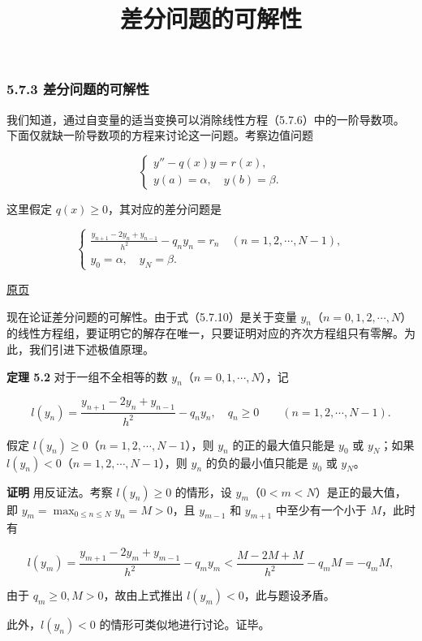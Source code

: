 \documentclass[
  10pt,
  fontset=fandol]{ctexart}
\title{差分问题的可解性}
\author{}
\date{}
\begin{document}
\maketitle

\subsubsection{5.7.3 差分问题的可解性}\label{ux5deeux5206ux95eeux9898ux7684ux53efux89e3ux6027}

我们知道，通过自变量的适当变换可以消除线性方程（5.7.6）中的一阶导数项。下面仅就缺一阶导数项的方程来讨论这一问题。考察边值问题

\[
\begin{cases}
y''-q(x)y=r(x),\\
y(a)=\alpha,\quad y(b)=\beta.
\end{cases}
\tag{5.7.9}
\]

这里假定 \(q(x)\ge0\)，其对应的差分问题是

\[
\begin{cases}
\displaystyle\frac{y_{n+1}-2y_n+y_{n-1}}{h^2}-q_ny_n=r_n\quad(n=1,2,\cdots,N-1),\\[6pt]
y_0=\alpha,\quad y_N=\beta.
\end{cases}
\tag{5.7.10}
\]

\href{../../source-images/pdf-151.jpeg}{原页}

现在论证差分问题的可解性。由于式（5.7.10）是关于变量 \(y_n\)（\(n=0,1,2,\cdots,N\)）的线性方程组，要证明它的解存在唯一，只要证明对应的齐次方程组只有零解。为此，我们引进下述极值原理。

\textbf{定理 5.2} 对于一组不全相等的数 \(y_n\)（\(n=0,1,\cdots,N\)），记

\[
l(y_n)=\frac{y_{n+1}-2y_n+y_{n-1}}{h^2}-q_ny_n,\quad q_n\ge0\qquad(n=1,2,\cdots,N-1).
\]

假定 \(l(y_n)\ge0\)（\(n=1,2,\cdots,N-1\)），则 \(y_n\) 的正的最大值只能是 \(y_0\) 或 \(y_N\)；如果 \(l(y_n)<0\)（\(n=1,2,\cdots,N-1\)），则 \(y_n\) 的负的最小值只能是 \(y_0\) 或 \(y_N\)。

\textbf{证明} 用反证法。考察 \(l(y_n)\ge0\) 的情形，设 \(y_m\)（\(0<m<N\)）是正的最大值，即 \(y_m=\max_{0\le n\le N}y_n=M>0\)，且 \(y_{m-1}\) 和 \(y_{m+1}\) 中至少有一个小于 \(M\)，此时有

\[
l(y_m)=\frac{y_{m+1}-2y_m+y_{m-1}}{h^2}-q_my_m<\frac{M-2M+M}{h^2}-q_mM=-q_mM,
\]

由于 \(q_m\ge0,M>0\)，故由上式推出 \(l(y_m)<0\)，此与题设矛盾。

此外，\(l(y_n)<0\) 的情形可类似地进行讨论。证毕。
\end{document}
